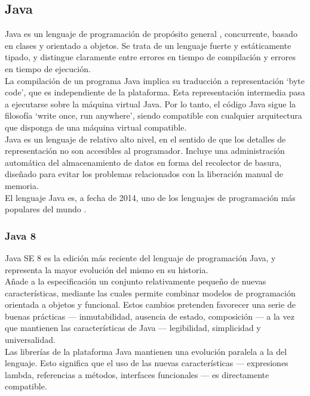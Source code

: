 \subsection{Java}
Java es un lenguaje de programación de propósito general \cite{jls8}, concurrente, basado en clases y orientado a objetos.
Se trata de un lenguaje fuerte y estáticamente tipado, y distingue claramente entre errores en tiempo de compilación y errores en tiempo de ejecución.
\\
La compilación de un programa Java implica su traducción a representación `byte code', que es independiente de la plataforma.
Esta representación intermedia pasa a ejecutarse sobre la máquina virtual Java.
Por lo tanto, el código Java sigue la filosofía `write once, run anywhere', siendo compatible con cualquier arquitectura que disponga de una máquina virtual compatible.
\\
Java es un lenguaje de relativo alto nivel, en el sentido de que los detalles de representación no son accesibles al programador.
Incluye una administración automática del almacenamiento de datos en forma del recolector de basura, diseñado para evitar los problemas relacionados con la liberación manual de memoria.
\\
El lenguaje Java es, a fecha de 2014, uno de los lenguajes de programación más populares del mundo \cite{website:tiobe}.

\subsubsection{Java 8}
Java SE 8 es la edición más reciente del lenguaje de programación Java, y representa la mayor evolución del mismo en su historia.
\\
Añade a la especificación un conjunto relativamente pequeño de nuevas características, mediante las cuales permite combinar modelos de programación orientada a objetos y funcional.
Estos cambios pretenden favorecer una serie de buenas prácticas --- inmutabilidad, ausencia de estado, composición --- a la vez que mantienen las características de Java --- legibilidad, simplicidad y universalidad.
\\
Las librerías de la plataforma Java mantienen una evolución paralela a la del lenguaje.
Esto significa que el uso de las nuevas características --- expresiones lambda, referencias a métodos, interfaces funcionales --- es directamente compatible.
\cite{jls8}

